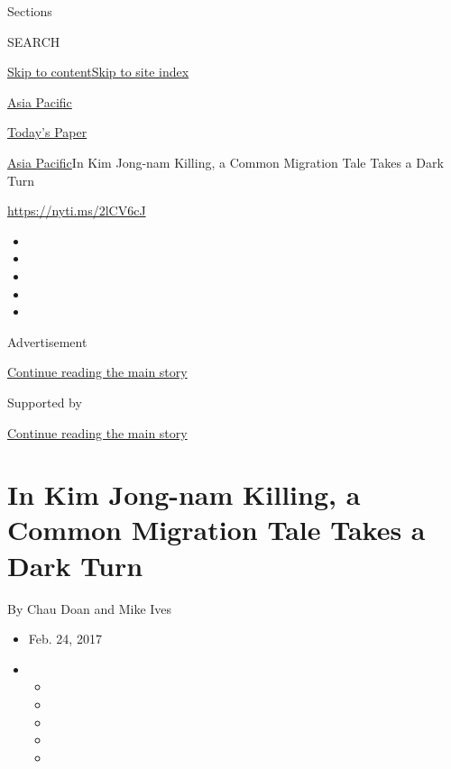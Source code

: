 Sections

SEARCH

\protect\hyperlink{site-content}{Skip to
content}\protect\hyperlink{site-index}{Skip to site index}

\href{https://www.nytimes3xbfgragh.onion/section/world/asia}{Asia
Pacific}

\href{https://myaccount.nytimes3xbfgragh.onion/auth/login?response_type=cookie\&client_id=vi}{}

\href{https://www.nytimes3xbfgragh.onion/section/todayspaper}{Today's
Paper}

\href{/section/world/asia}{Asia Pacific}\textbar{}In Kim Jong-nam
Killing, a Common Migration Tale Takes a Dark Turn

\url{https://nyti.ms/2lCV6cJ}

\begin{itemize}
\item
\item
\item
\item
\item
\end{itemize}

Advertisement

\protect\hyperlink{after-top}{Continue reading the main story}

Supported by

\protect\hyperlink{after-sponsor}{Continue reading the main story}

\hypertarget{in-kim-jong-nam-killing-a-common-migration-tale-takes-a-dark-turn}{%
\section{In Kim Jong-nam Killing, a Common Migration Tale Takes a Dark
Turn}\label{in-kim-jong-nam-killing-a-common-migration-tale-takes-a-dark-turn}}

By Chau Doan and Mike Ives

\begin{itemize}
\item
  Feb. 24, 2017
\item
  \begin{itemize}
  \item
  \item
  \item
  \item
  \item
  \end{itemize}
\end{itemize}

